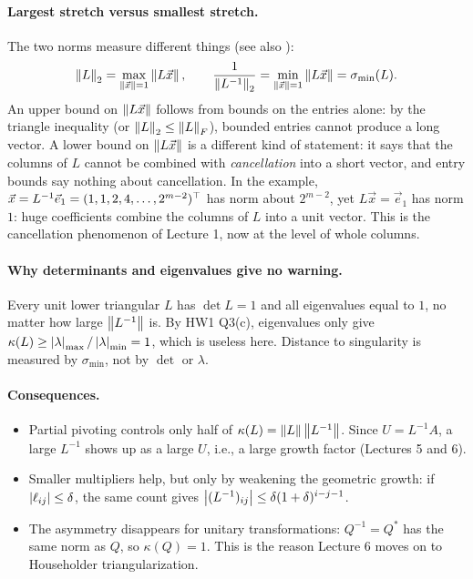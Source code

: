 \begin{answer}
  \paragraph{Largest stretch versus smallest stretch.} The two norms measure different things (see also ):
  \begin{equation}
    \left\lVert L \right\rVert_2 = \max_{\left\lVert \vec{x} \right\rVert = 1}\left\lVert L\vec{x} \right\rVert, \qquad \frac{1}{\left\lVert L^{-1} \right\rVert_2} = \min_{\left\lVert \vec{x} \right\rVert = 1}\left\lVert L\vec{x} \right\rVert = \sigma_{\min}(L).
  \end{equation}
  An upper bound on $\left\lVert L\vec{x} \right\rVert$ follows from bounds on the entries alone: by the triangle inequality (or $\left\lVert L \right\rVert_2 \le \left\lVert L \right\rVert_F$), bounded entries cannot produce a long vector. A lower bound on $\left\lVert L\vec{x} \right\rVert$ is a different kind of statement: it says that the columns of $L$ cannot be combined with \emph{cancellation} into a short vector, and entry bounds say nothing about cancellation. In the example, $\vec{x} = L^{-1}\vec{e}_1 = (1, 1, 2, 4, \dots, 2^{m-2})^\top$ has norm about $2^{m-2}$, yet $L\vec{x} = \vec{e}_1$ has norm $1$: huge coefficients combine the columns of $L$ into a unit vector. This is the cancellation phenomenon of Lecture 1, now at the level of whole columns.

  \paragraph{Why determinants and eigenvalues give no warning.} Every unit lower triangular $L$ has $\det L = 1$ and all eigenvalues equal to $1$, no matter how large $\left\lVert L^{-1} \right\rVert$ is. By HW1 Q3(c), eigenvalues only give $\kappa(L) \ge \left\lvert \lambda \right\rvert_{\max}/\left\lvert \lambda \right\rvert_{\min} = 1$, which is useless here. Distance to singularity is measured by $\sigma_{\min}$, not by $\det$ or $\lambda$.

  \paragraph{Consequences.}
  \begin{itemize}
    \item Partial pivoting controls only half of $\kappa(L) = \left\lVert L \right\rVert\left\lVert L^{-1} \right\rVert$. Since $U = L^{-1}A$, a large $L^{-1}$ shows up as a large $U$, i.e., a large growth factor (Lectures 5 and 6).
    \item Smaller multipliers help, but only by weakening the geometric growth: if $\left\lvert \ell_{ij} \right\rvert \le \delta$, the same count gives $\left\lvert (L^{-1})_{ij} \right\rvert \le \delta(1 + \delta)^{i-j-1}$.
    \item The asymmetry disappears for unitary transformations: $Q^{-1} = Q^\ast$ has the same norm as $Q$, so $\kappa(Q) = 1$. This is the reason Lecture 6 moves on to Householder triangularization.
  \end{itemize}
\end{answer}
